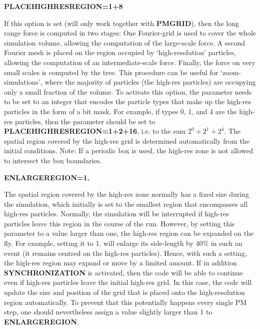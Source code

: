 \begin{DoxyItemize}
\item {\bfseries \-P\-L\-A\-C\-E\-H\-I\-G\-H\-R\-E\-S\-R\-E\-G\-I\-O\-N=1+8} \par
 \-If this option is set (will only work together with {\bfseries \-P\-M\-G\-R\-I\-D}), then the long range force is computed in two stages\-: \-One \-Fourier-\/grid is used to cover the whole simulation volume, allowing the computation of the large-\/scale force. \-A second \-Fourier mesh is placed on the region occupied by `high-\/resolution' particles, allowing the computation of an intermediate-\/scale force. \-Finally, the force on very small scales is computed by the tree. \-This procedure can be useful for `zoom-\/simulations', where the majority of particles (the high-\/res particles) are occupying only a small fraction of the volume. \-To activate this option, the parameter needs to be set to an integer that encodes the particle types that make up the high-\/res particles in the form of a bit mask. \-For example, if types 0, 1, and 4 are the high-\/res particles, then the parameter should be set to {\bfseries \-P\-L\-A\-C\-E\-H\-I\-G\-H\-R\-E\-S\-R\-E\-G\-I\-O\-N=1+2+16}, i.\-e. to the sum $2^0+2^1+2^4$. \-The spatial region covered by the high-\/res grid is determined automatically from the initial conditions. \-Note\-: \-If a periodic box is used, the high-\/res zone is not allowed to intersect the box boundaries.
\end{DoxyItemize}


\begin{DoxyItemize}
\item {\bfseries  \-E\-N\-L\-A\-R\-G\-E\-R\-E\-G\-I\-O\-N=1.} \par
 \-The spatial region covered by the high-\/res zone normally has a fixed size during the simulation, which initially is set to the smallest region that encompasses all high-\/res particles. \-Normally, the simulation will be interrupted if high-\/res particles leave this region in the course of the run. \-However, by setting this parameter to a value larger than one, the high-\/res region can be expanded on the fly. \-For example, setting it to 1. will enlarge its side-\/length by 40\% in such an event (it remains centred on the high-\/res particles). \-Hence, with such a setting, the high-\/res region may expand or move by a limited amount. \-If in addition {\bfseries \-S\-Y\-N\-C\-H\-R\-O\-N\-I\-Z\-A\-T\-I\-O\-N} is activated, then the code will be able to continue even if high-\/res particles leave the initial high-\/res grid. \-In this case, the code will update the size and position of the grid that is placed onto the high-\/resolution region automatically. \-To prevent that this potentially happens every single \-P\-M step, one should nevertheless assign a value slightly larger than 1 to {\bfseries \-E\-N\-L\-A\-R\-G\-E\-R\-E\-G\-I\-O\-N}.
\end{DoxyItemize}


